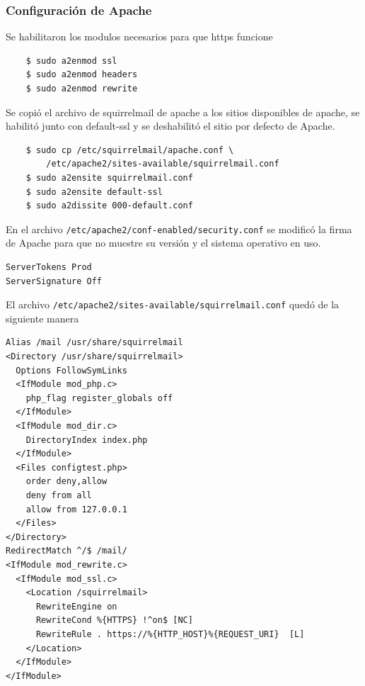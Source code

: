 \documentclass[9pt]{article}
\begin{document}

\subsubsection*{Configuración de Apache}

Se habilitaron los modulos necesarios para que \textsf{https} funcione \\
\begin{verbatim}
    $ sudo a2enmod ssl
    $ sudo a2enmod headers
    $ sudo a2enmod rewrite
\end{verbatim}

Se copió el archivo de squirrelmail de apache a los sitios disponibles de apache, se habilitó junto con \textsf{default-ssl} y se deshabilitó el sitio por defecto de Apache. \\
\begin{verbatim}
    $ sudo cp /etc/squirrelmail/apache.conf \
        /etc/apache2/sites-available/squirrelmail.conf
    $ sudo a2ensite squirrelmail.conf
    $ sudo a2ensite default-ssl
    $ sudo a2dissite 000-default.conf
\end{verbatim}

En el archivo \texttt{/etc/apache2/conf-enabled/security.conf} se modificó la firma de Apache para que no muestre su versión y el sistema operativo en uso. \\
\begin{verbatim}
ServerTokens Prod
ServerSignature Off
\end{verbatim}

El archivo \texttt{/etc/apache2/sites-available/squirrelmail.conf} quedó de la siguiente manera
\begin{verbatim}
Alias /mail /usr/share/squirrelmail
<Directory /usr/share/squirrelmail>
  Options FollowSymLinks
  <IfModule mod_php.c>
    php_flag register_globals off
  </IfModule>
  <IfModule mod_dir.c>
    DirectoryIndex index.php
  </IfModule>
  <Files configtest.php>
    order deny,allow
    deny from all
    allow from 127.0.0.1
  </Files>
</Directory>
RedirectMatch ^/$ /mail/
<IfModule mod_rewrite.c>
  <IfModule mod_ssl.c>
    <Location /squirrelmail>
      RewriteEngine on
      RewriteCond %{HTTPS} !^on$ [NC]
      RewriteRule . https://%{HTTP_HOST}%{REQUEST_URI}  [L]
    </Location>
  </IfModule>
</IfModule>
\end{verbatim}
\end{document}
